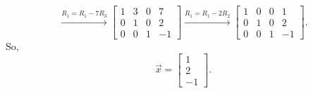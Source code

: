 \begin{equation*}
	\stackrel{R_1 = R_1 - 7R_3}{\to} \left[
		\begin{array}{ccc|c}
			1 & 3 & 0 & 7 \\
			0 & 1 & 0 & 2 \\
			0 & 0 & 1 & -1
		\end{array}
	\right] \stackrel{R_1 = R_1 - 2R_2}{\to} \left[
		\begin{array}{ccc|c}
			1 & 0 & 0 & 1 \\
			0 & 1 & 0 & 2 \\
			0 & 0 & 1 & -1
		\end{array}
	\right].
\end{equation*}
So,
\begin{equation*}
	\vec{x} = \begin{bmatrix}
		1 \\
		2 \\
		-1
	\end{bmatrix}.
\end{equation*}